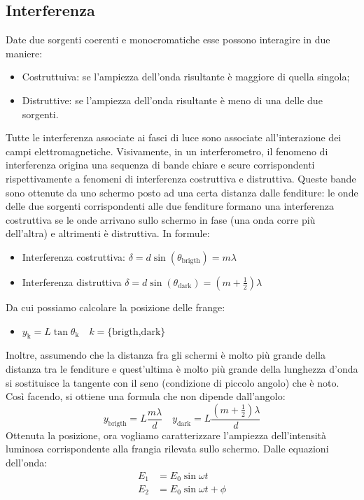 \documentclass{article}
\begin{document}
\subsection{Interferenza}
Date due sorgenti coerenti e monocromatiche esse possono interagire in due maniere:\begin{itemize}
	\item Costruttuiva: se l'ampiezza dell'onda risultante è maggiore di quella singola;
	\item Distruttive: se l'ampiezza dell'onda risultante è meno di una delle due sorgenti.
\end{itemize}
Tutte le interferenza associate ai fasci di luce sono associate all'interazione dei campi elettromagnetiche. Visivamente, in un interferometro, il fenomeno di interferenza origina una sequenza di bande chiare e scure corrispondenti rispettivamente a fenomeni di interferenza costruttiva e distruttiva. Queste bande sono ottenute da uno schermo posto ad una certa distanza dalle fenditure: le onde delle due sorgenti corrispondenti alle due fenditure formano una interferenza costruttiva se le onde arrivano sullo schermo in fase (una onda corre più dell'altra) e altrimenti è distruttiva.
In formule:\begin{itemize}
	\item Interferenza costruttiva: \(\delta= d\sin{(\theta_{\text{brigth}})}=m\lambda \)
	\item Interferenza distruttiva  \(\delta= d\sin{(\theta_{\text{dark}})}=(m+\frac{1}{2})\lambda \)
\end{itemize}
Da cui possiamo calcolare la posizione delle frange:\begin{itemize}
	\item \(y_{\text{k}}=L\tan{\theta_{\text{k}}}\quad k =\{\text{brigth,dark}\} \)
\end{itemize}
Inoltre, assumendo che la distanza fra gli schermi è molto più grande della distanza tra le fenditure e quest'ultima è molto più grande della lunghezza d'onda si sostituisce la tangente con il seno (condizione di piccolo angolo) che è noto. Così facendo, si ottiene una formula che non dipende dall'angolo:\begin{equation}
	y_{\text{brigth}}= L\frac{m\lambda}{d}\quad  y_{\text{dark}}= L\frac{(m+\frac{1}{2})\lambda}{d}
\end{equation}
Ottenuta la posizione, ora vogliamo caratterizzare l'ampiezza dell'intensità luminosa corrispondente alla frangia rilevata sullo schermo. Dalle equazioni dell'onda:\begin{align}
	E_{1} & =E_{0}\sin{\omega t}      \\
	E_{2} & =E_{0}\sin{\omega t+\phi}
\end{align}
\end{document}
